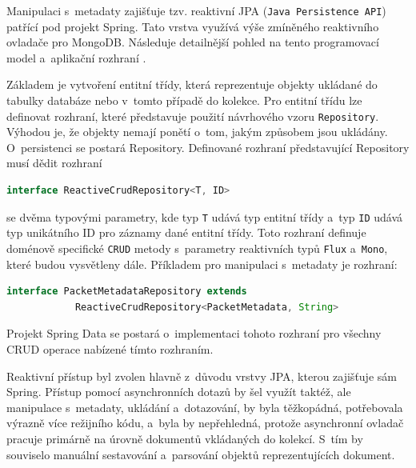 
Manipulaci s~metadaty zajišťuje tzv. reaktivní JPA (\texttt{Java Persistence API}) patřící pod projekt Spring. Tato vrstva využívá výše zmíněného reaktivního ovladače pro MongoDB. Následuje detailnější pohled na tento programovací model a~aplikační rozhraní \cite{springDataReactive}.

Základem je vytvoření entitní třídy, která reprezentuje objekty ukládané do tabulky databáze nebo v~tomto případě do kolekce. Pro entitní třídu lze definovat rozhraní, které představuje použití návrhového vzoru \texttt{Repository}. Výhodou je, že objekty nemají ponětí o~tom, jakým způsobem jsou ukládány. O~persistenci se postará Repository. Definované rozhraní představující Repository musí dědit rozhraní

\begin{lstlisting}[language=Java]
    interface ReactiveCrudRepository<T, ID>
\end{lstlisting}

\noindent se dvěma typovými parametry, kde typ \texttt{T} udává typ entitní třídy a~typ \texttt{ID} udává typ unikátního ID pro záznamy dané entitní třídy. Toto rozhraní definuje doménově specifické \texttt{CRUD} metody s~parametry reaktivních typů \texttt{Flux} a~\texttt{Mono}, které budou vysvětleny dále. Příkladem pro manipulaci s~metadaty je rozhraní:

\begin{lstlisting}[language=Java]
    interface PacketMetadataRepository extends
            ReactiveCrudRepository<PacketMetadata, String>
\end{lstlisting}

\noindent Projekt Spring Data se postará o~implementaci tohoto rozhraní pro všechny CRUD operace nabízené tímto rozhraním.

Reaktivní přístup byl zvolen hlavně z~důvodu vrstvy JPA, kterou zajišťuje sám Spring. Přístup pomocí asynchronních dotazů by šel využít taktéž, ale manipulace s~metadaty, ukládání a~dotazování, by byla těžkopádná, potřebovala výrazně více režijního kódu, a~byla by nepřehledná, protože asynchronní ovladač pracuje primárně na úrovně dokumentů vkládaných do kolekcí. S~tím by souviselo manuální sestavování a~parsování objektů reprezentujících dokument.

